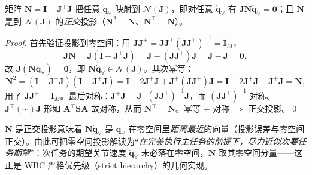 \begin{theorem}[零空间投影矩阵 $\mathbf{N}=\mathbf{I}-\mathbf{J}^{+}\mathbf{J}$]\label{thm:qk-nullspace-proj}
矩阵 $\mathbf{N}=\mathbf{I}-\mathbf{J}^{+}\mathbf{J}$ 把任意 $\dot{\boldsymbol{q}}_{\forall}$ 映射到 $\mathcal{N}(\mathbf{J})$，即对任意 $\dot{\boldsymbol{q}}_{\forall}$ 有 $\mathbf{J}\mathbf{N}\dot{\boldsymbol{q}}_{\forall}=\mathbf{0}$；且 $\mathbf{N}$ 是到 $\mathcal{N}(\mathbf{J})$ 的\emph{正交}投影（$\mathbf{N}^2=\mathbf{N}$、$\mathbf{N}^\top=\mathbf{N}$）。
\end{theorem}
\begin{proof}
首先验证投影到零空间：用 $\mathbf{J}\mathbf{J}^{+}=\mathbf{J}\mathbf{J}^\top(\mathbf{J}\mathbf{J}^\top)^{-1}=\mathbf{I}_M$，
\begin{equation}
  \mathbf{J}\mathbf{N}=\mathbf{J}(\mathbf{I}-\mathbf{J}^{+}\mathbf{J})=\mathbf{J}-(\mathbf{J}\mathbf{J}^{+})\mathbf{J}=\mathbf{J}-\mathbf{J}=\mathbf{0},
  \label{eq:qk-JN-zero}
\end{equation}
故 $\mathbf{J}(\mathbf{N}\dot{\boldsymbol{q}}_{\forall})=\mathbf{0}$，即 $\mathbf{N}\dot{\boldsymbol{q}}_{\forall}\in\mathcal{N}(\mathbf{J})$。其次幂等：
\[
  \mathbf{N}^2=(\mathbf{I}-\mathbf{J}^{+}\mathbf{J})(\mathbf{I}-\mathbf{J}^{+}\mathbf{J})
  =\mathbf{I}-2\mathbf{J}^{+}\mathbf{J}+\mathbf{J}^{+}(\mathbf{J}\mathbf{J}^{+})\mathbf{J}
  =\mathbf{I}-2\mathbf{J}^{+}\mathbf{J}+\mathbf{J}^{+}\mathbf{J}=\mathbf{N},
\]
用了 $\mathbf{J}\mathbf{J}^{+}=\mathbf{I}_M$。最后对称：$\mathbf{J}^{+}\mathbf{J}=\mathbf{J}^\top(\mathbf{J}\mathbf{J}^\top)^{-1}\mathbf{J}$，而 $(\mathbf{J}\mathbf{J}^\top)^{-1}$ 对称、$\mathbf{J}^\top(\cdots)\mathbf{J}$ 形如 $\mathbf{A}^\top\mathbf{S}\mathbf{A}$ 故对称，从而 $\mathbf{N}^\top=\mathbf{N}$。幂等 $+$ 对称 $\Rightarrow$ 正交投影。\qed
\end{proof}

\begin{insight}\label{ins:qk-proj-best}
$\mathbf{N}$ 是正交投影意味着 $\mathbf{N}\dot{\boldsymbol{q}}_{\forall}$ 是 $\dot{\boldsymbol{q}}_{\forall}$ 在零空间里\emph{距离最近}的向量（投影误差与零空间正交）。由此可把零空间投影解读为“\emph{在完美执行主任务的前提下，尽力近似次要任务期望}”：次任务的期望关节速度 $\dot{\boldsymbol{q}}_{\forall}$ 未必落在零空间，$\mathbf{N}$ 取其零空间分量——这正是 WBC 严格优先级（strict hierarchy）的几何实现。
\end{insight}

